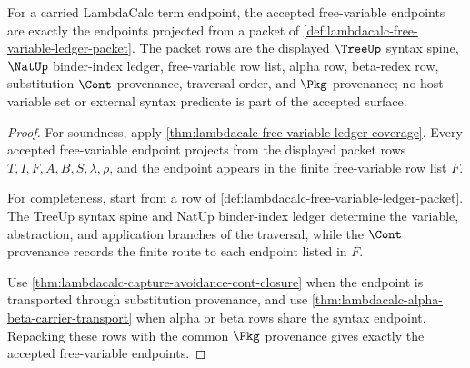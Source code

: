 \begin{theorem}
\label{thm:lambdacalc-free-variable-ledger-exactness}
For a carried LambdaCalc term endpoint, the accepted free-variable endpoints
are exactly the endpoints projected from a packet of
\autoref{def:lambdacalc-free-variable-ledger-packet}. The packet rows are the
displayed $\TreeUp$ syntax spine, $\NatUp$ binder-index ledger,
free-variable row list, alpha row, beta-redex row, substitution $\Cont$
provenance, traversal order, and $\Pkg$ provenance; no host variable set or
external syntax predicate is part of the accepted surface.
\end{theorem}
\begin{proof}
For soundness, apply
\autoref{thm:lambdacalc-free-variable-ledger-coverage}. Every accepted
free-variable endpoint projects from the displayed packet rows
$T,I,F,A,B,S,\lambda,\rho$, and the endpoint appears in the finite
free-variable row list $F$.

For completeness, start from a row of
\autoref{def:lambdacalc-free-variable-ledger-packet}. The TreeUp syntax spine
and NatUp binder-index ledger determine the variable, abstraction, and
application branches of the traversal, while the $\Cont$ provenance records
the finite route to each endpoint listed in $F$.

Use \autoref{thm:lambdacalc-capture-avoidance-cont-closure} when the endpoint
is transported through substitution provenance, and use
\autoref{thm:lambdacalc-alpha-beta-carrier-transport} when alpha or beta rows
share the syntax endpoint. Repacking these rows with the common $\Pkg$
provenance gives exactly the accepted free-variable endpoints.
\end{proof}

